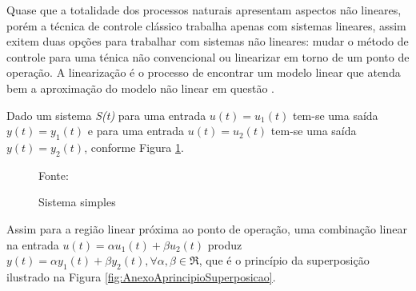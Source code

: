 Quase que a totalidade dos processos naturais apresentam aspectos não lineares, porém a técnica de controle clássico trabalha apenas com sistemas lineares, assim exitem duas opções para trabalhar com sistemas não lineares: mudar o método de controle para uma ténica não convencional ou linearizar em torno de um ponto de operação. 
A linearização é o processo de encontrar um modelo linear que atenda bem a aproximação do modelo não linear em questão \cite{Ogata}.


Dado um sistema \emph{S(t)} para uma entrada $u(t) = u_1(t)$ tem-se
uma saída $y(t) = y_1(t)$ e para uma entrada $u(t) = u_2(t)$ tem-se
uma saída $y(t) = y_2(t)$, conforme Figura \ref{fig:AnexoAsistemaSimples}.

\begin{figure}[!htb]
\centering
\caption{ Sistema simples}
\label{fig:AnexoAsistemaSimples}

{\small Fonte: \cite{Ogata}}
\end{figure}

Assim para a região linear próxima ao ponto de operação, uma combinação linear na entrada $u(t) = \alpha u_1(t) + \beta u_2(t)$ produz $y(t) = \alpha y_1(t) + \beta y_2(t), \forall \alpha ,  \beta \in \Re $, que é o princípio da superposição ilustrado na Figura \ref{fig:AnexoAprincipioSuperposicao}.


